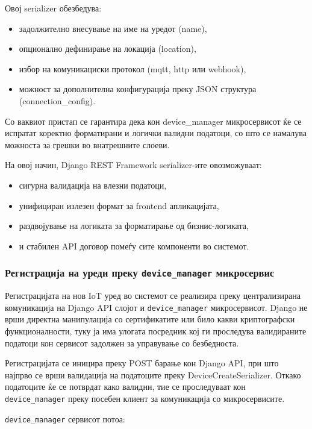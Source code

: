 Овој serializer обезбедува:

\begin{itemize}
\item
  задолжително внесување на име на уредот (name),
\item
  опционално дефинирање на локација (location),
\item
  избор на комуникациски протокол (mqtt, http или webhook),
\item
  можност за дополнителна конфигурација преку JSON структура
  (connection\_config).
\end{itemize}

Со ваквиот пристап се гарантира дека кон device\_manager микросервисот
ќе се испратат коректно форматирани и логички валидни податоци, со што
се намалува можноста за грешки во внатрешните слоеви.

На овој начин, Django REST Framework serializer-ите овозможуваат:

\begin{itemize}
\item
  сигурна валидација на влезни податоци,
\item
  унифициран излезен формат за frontend апликацијата,
\item
  раздвојување на логиката за форматирање од бизнис-логиката,
\item
  и стабилен API договор помеѓу сите компоненти во системот.
\end{itemize}

\subsubsection{Регистрација на уреди преку \texttt{device\_manager} микросервис}

Регистрацијата на нов IoT уред во системот се реализира преку
централизирана комуникација на Django API слојот и \texttt{device\_manager}
микросервисот. Django не врши директна манипулација со сертификатите или
било какви криптографски функционалности, туку ја има улогата посредник
кој ги проследува валидираните податоци кон сервисот задолжен за
управување со безбедноста.

Регистрацијата се иницира преку POST барање кон Django API, при што
најпрво се врши валидација на податоците преку DeviceCreateSerializer.
Откако податоците ќе се потврдат како валидни, тие се проследуваат кон
\texttt{device\_manager} преку посебен клиент за комуникација со микросервисите.

\texttt{device\_manager} сервисот потоа:

